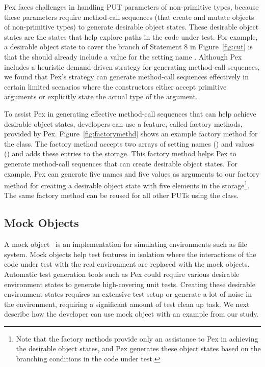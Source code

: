 Pex faces challenges in handling PUT parameters of non-primitive types, because these parameters require method-call sequences (that create and mutate objects of non-primitive types) to generate desirable object states. These desirable object states are the states that help explore paths in the code under test. For example, a desirable object state to cover the  branch of Statement 8 in Figure~\ref{fig:cut} is that the  should already include a value for the setting name . 
Although Pex includes a heuristic demand-driven strategy for generating method-call sequences, we found that Pex's strategy can generate method-call sequences effectively in certain limited scenarios where the constructors either accept primitive arguments or explicitly state the actual type of the argument.

To assist Pex in generating effective method-call sequences that can help achieve desirable object states, developers can use a feature, called factory methods, provided by Pex. Figure~\ref{fig:factorymethd} shows an example factory method for the  class. The factory method accepts two arrays of setting names () and values () and adds these entries to the storage. This factory method helps Pex to generate method-call sequences that can create desirable object states. For example, Pex can generate five names and five values as arguments to our factory method for creating a desirable object state with five elements in the storage\footnote{Note that the factory methods provide only an assistance to Pex in achieving the desirable object states, and Pex generates these object states based on the branching conditions in the code under test.}. The same factory method can be reused for all other PUTs using the  class.

\subsection{Mock Objects} 
\label{sec:mock}

A mock object~\cite{mockobjects} is an implementation for simulating environments such as file system. Mock objects help test features in isolation where the interactions of the code under test with the real environment are replaced with the mock objects. Automatic test generation tools such as Pex could require various desirable environment states to generate high-covering unit tests. Creating these desirable environment states requires an extensive test setup or generate a lot of noise in the environment, requiring a significant amount of test clean up task. We next describe how the developer can use mock object with an example from our study. 

